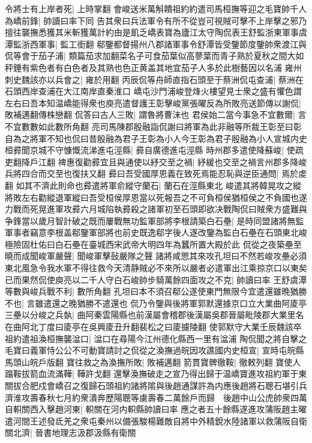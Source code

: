 令將士有上岸者死|{
	上時掌翻}
會峻送米萬斛饋祖約約遣司馬桓撫等迎之毛寶帥千人為嶠前鋒|{
	帥讀曰率下同}
告其衆曰兵法軍令有所不從豈可視賊可擊不上岸擊之邪乃擅往襲撫悉獲其米斬獲萬計約由是飢乏嶠表寶為廬江太守陶侃表王舒監浙東軍事虞潭監浙西軍事|{
	監工銜翻}
郗鑒都督揚州八郡諸軍事令舒潭皆受鑒節度鑒帥衆渡江與侃等會于茄子浦|{
	類篇茄求加翻菜名子可食茄葉似高蓼葉而青子熟於夏秋之間大如秤錘有紫色者有白色者及其熟也色正黄盖其地宜茄子人多於此樹藝因以名浦}
雍州刺史魏該亦以兵會之|{
	雍於用翻}
丙辰侃等舟師直指石頭至于蔡洲侃屯查浦|{
	蔡洲在石頭西岸查浦在大江南岸直秦淮口}
嶠屯沙門浦峻登烽火樓望見士衆之盛有懼色謂左右曰吾本知温嶠能得衆也庾亮遣督護王彰擊峻黨張曜反為所敗亮送節傳以謝侃|{
	敗補邁翻傳株戀翻}
侃答曰古人三敗|{
	謂魯將曹沬也}
君侯始二當今事急不宜數爾|{
	言不宜數數如此數所角翻}
亮司馬陳郡殷融詣侃謝曰將軍為此非融等所裁王彰至曰彰自為之將軍不知也侃曰昔殷融為君子王彰為小人今王彰為君子殷融為小人宣城内史桓彛聞京城不守慷慨流涕進屯涇縣|{
	彛自廣德進屯涇縣}
時州郡多遣使降蘇峻|{
	使疏吏翻降戶江翻}
禆惠復勸彛宜且與通使以紓交至之禍|{
	紓緩也交至之禍言州郡多降峻兵將四合而交至也復扶又翻}
彛曰吾受國厚恩義在致死焉能忍恥與逆臣通問|{
	焉於䖍翻}
如其不濟此則命也彛遣將軍俞縱守蘭石|{
	蘭石在涇縣東北}
峻遣其將韓晃攻之縱將敗左右勸縱退軍縱曰吾受桓侯厚恩當以死報吾之不可負桓侯猶桓侯之不負國也遂力戰而死晃進軍攻彛六月城陷執彛殺之諸軍初至石頭即欲决戰陶侃曰賊衆方盛難與争鋒當以歲月智計破之既而屢戰無功監軍部將李根請築白石壘|{
	是時同盟諸將無監軍事者竊意李根盖郗鑒軍部將也前史既逸郗字後人遂改鑒為監白石壘在石頭東北峻極險固杜佑曰白石壘在臺城西宋武帝大明四年為蠶所置大殿於此}
侃從之夜築壘至曉而成聞峻軍嚴聲|{
	聞峻軍擊鼔嚴隊之聲}
諸將咸愳其來攻孔坦曰不然若峻攻壘必須東北風急令我水軍不得往救今天清静賊必不來所以嚴者必遣軍出江乘掠京口以東矣已而果然侃使庾亮以二千人守白石峻帥步騎萬餘四面攻之不克|{
	帥讀曰率}
王舒虞潭等數與峻兵戰不利|{
	數所角翻}
孔坦曰本不須召郗公遂使東門無限今宜遣還雖晩猶勝不也|{
	言雖遣還之晚猶勝不遣還也}
侃乃令鑒與後將軍郭默還據京口立大業曲阿庱亭三壘以分峻之兵埶|{
	曲阿秦雲陽縣也前漢屬會稽郡後漢屬吳郡晉屬毗陵郡大業里名在曲阿北丁度曰庱亭在吳興庱丑升翻裴松之曰庱攄陵翻}
使郭默守大業壬辰魏該卒祖約遣祖渙桓撫襲湓口|{
	湓口在尋陽今江州德化縣西一里有湓浦}
陶侃聞之將自擊之毛寶曰義軍恃公公不可動寶請討之侃從之渙撫過皖因攻譙國内史桓宣|{
	宣時屯皖縣馬頭山皖戶版翻}
寶往救之為渙撫所敗|{
	敗補邁翻}
箭貫寶髀徹鞍|{
	徹敕列翻}
寶使人蹋鞍拔箭血流滿鞾|{
	鞾許戈翻}
還擊渙撫破走之宣乃得出歸于温嶠寶進攻祖約軍于東關拔合肥戍會嶠召之復歸石頭祖約諸將隂與後趙通謀許為内應後趙將石聰石堪引兵濟淮攻壽春秋七月約衆潰奔歷陽聰等虜壽春二萬餘戶而歸　後趙中山公虎帥衆四萬自軹關西入擊趙河東|{
	軹關在河内軹縣帥讀曰率}
應之者五十餘縣遂進攻蒲阪趙主曜遣河間王述發氐羌之衆屯秦州以備張駿楊難敵自將中外精銳水陸諸軍以救蒲阪自衛關北濟|{
	晉書地理志汲郡汲縣有衛關}
